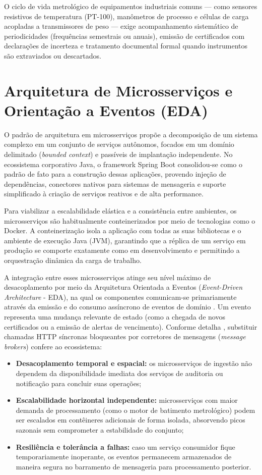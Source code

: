 O ciclo de vida metrológico de equipamentos industriais comuns — como sensores resistivos de temperatura (PT-100), manômetros de processo e células de carga acopladas a transmissores de peso — exige acompanhamento sistemático de periodicidades (frequências semestrais ou anuais), emissão de certificados com declarações de incerteza e tratamento documental formal quando instrumentos são extraviados ou descartados.

\section{Arquitetura de Microsserviços e Orientação a Eventos (EDA)}

O padrão de arquitetura em microsserviços propõe a decomposição de um sistema complexo em um conjunto de serviços autônomos, focados em um domínio delimitado (\textit{bounded context}) e passíveis de implantação independente. No ecossistema corporativo Java, o framework Spring Boot consolidou-se como o padrão de fato para a construção dessas aplicações, provendo injeção de dependências, conectores nativos para sistemas de mensageria e suporte simplificado à criação de serviços reativos e de alta performance.

Para viabilizar a escalabilidade elástica e a consistência entre ambientes, os microsserviços são habitualmente conteinerizados por meio de tecnologias como o Docker. A conteinerização isola a aplicação com todas as suas bibliotecas e o ambiente de execução Java (JVM), garantindo que a réplica de um serviço em produção se comporte exatamente como em desenvolvimento e permitindo a orquestração dinâmica da carga de trabalho.

A integração entre esses microsserviços atinge seu nível máximo de desacoplamento por meio da Arquitetura Orientada a Eventos (\textit{Event-Driven Architecture} - EDA), na qual os componentes comunicam-se primariamente através da emissão e do consumo assíncrono de eventos de domínio \cite{richards2020}. Um evento representa uma mudança relevante de estado (como a chegada de novos certificados ou a emissão de alertas de vencimento). Conforme detalha , substituir chamadas HTTP síncronas bloqueantes por corretores de mensagens (\textit{message brokers}) confere ao ecossistema:
\begin{itemize}
    \item \textbf{Desacoplamento temporal e espacial:} os microsserviços de ingestão não dependem da disponibilidade imediata dos serviços de auditoria ou notificação para concluir suas operações;
    \item \textbf{Escalabilidade horizontal independente:} microsserviços com maior demanda de processamento (como o motor de batimento metrológico) podem ser escalados em contêineres adicionais de forma isolada, absorvendo picos sazonais sem comprometer a estabilidade do conjunto;
    \item \textbf{Resiliência e tolerância a falhas:} caso um serviço consumidor fique temporariamente inoperante, os eventos permanecem armazenados de maneira segura no barramento de mensageria para processamento posterior.
\end{itemize}

